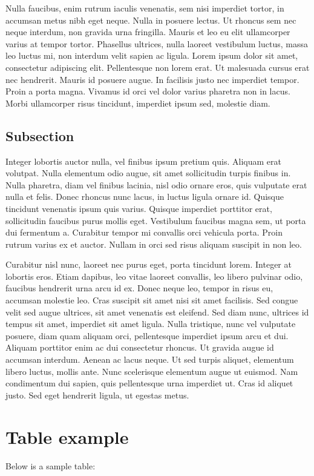 \documentclass[12pt]{article}
\begin{document}
Nulla faucibus, enim rutrum iaculis venenatis, sem nisi imperdiet tortor, in accumsan metus nibh eget neque. Nulla in posuere lectus. Ut rhoncus sem nec neque interdum, non gravida urna fringilla. Mauris et leo eu elit ullamcorper varius at tempor tortor. Phasellus ultrices, nulla laoreet vestibulum luctus, massa leo luctus mi, non interdum velit sapien ac ligula. Lorem ipsum dolor sit amet, consectetur adipiscing elit. Pellentesque non lorem erat. Ut malesuada cursus erat nec hendrerit. Mauris id posuere augue. In facilisis justo nec imperdiet tempor. Proin a porta magna. Vivamus id orci vel dolor varius pharetra non in lacus. Morbi ullamcorper risus tincidunt, imperdiet ipsum sed, molestie diam.

 
\subsection{Subsection}

Integer lobortis auctor nulla, vel finibus ipsum pretium quis. Aliquam erat volutpat. Nulla elementum odio augue, sit amet sollicitudin turpis finibus in. Nulla pharetra, diam vel finibus lacinia, nisl odio ornare eros, quis vulputate erat nulla et felis. Donec rhoncus nunc lacus, in luctus ligula ornare id. Quisque tincidunt venenatis ipsum quis varius. Quisque imperdiet porttitor erat, sollicitudin faucibus purus mollis eget. Vestibulum faucibus magna sem, ut porta dui fermentum a. Curabitur tempor mi convallis orci vehicula porta. Proin rutrum varius ex et auctor. Nullam in orci sed risus aliquam suscipit in non leo.

Curabitur nisl nunc, laoreet nec purus eget, porta tincidunt lorem. Integer at lobortis eros. Etiam dapibus, leo vitae laoreet convallis, leo libero pulvinar odio, faucibus hendrerit urna arcu id ex. Donec neque leo, tempor in risus eu, accumsan molestie leo. Cras suscipit sit amet nisi sit amet facilisis. Sed congue velit sed augue ultrices, sit amet venenatis est eleifend. Sed diam nunc, ultrices id tempus sit amet, imperdiet sit amet ligula. Nulla tristique, nunc vel vulputate posuere, diam quam aliquam orci, pellentesque imperdiet ipsum arcu et dui. Aliquam porttitor enim ac dui consectetur rhoncus. Ut gravida augue id accumsan interdum. Aenean ac lacus neque. Ut sed turpis aliquet, elementum libero luctus, mollis ante. Nunc scelerisque elementum augue ut euismod. Nam condimentum dui sapien, quis pellentesque urna imperdiet ut. Cras id aliquet justo. Sed eget hendrerit ligula, ut egestas metus. 

\section{Table example}
Below is a sample table:
\end{document}
